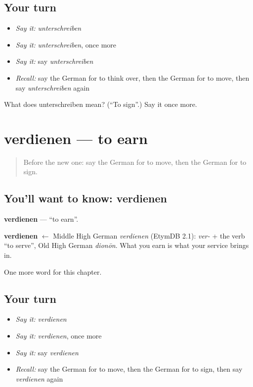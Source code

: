 \subsection*{Your turn}
\begin{itemize}
\raggedright
  \item \emph{Say it:} \emph{unterschreiben}
  \item \emph{Say it:} \emph{unterschreiben}, once more
  \item \emph{Say it:} say \emph{unterschreiben}
  \item \emph{Recall:} say the German for to think over, then the German for to move, then say \emph{unterschreiben} again
\end{itemize}

\begin{tcolorbox}[breakable,colback=teal!4,colframe=teal!35!black,title={Before you move on}]
What does unterschreiben mean? (\textquotedblleft{}To sign\textquotedblright{}.) Say it once more.
\end{tcolorbox}
\section[verdienen]{verdienen — to earn}

\label{lesson:GE-C152-verdienen}



\begin{quote}
Before the new one: say the German for to move, then the German for to sign.
\end{quote}

\subsection*{You'll want to know: verdienen}
\textbf{verdienen} — \textquotedblleft{}to earn\textquotedblright{}.

\begin{cousinweb}
\textbf{verdienen} $\leftarrow$ Middle High German \emph{verdienen} (EtymDB 2.1): \emph{ver-} + the verb \textquotedblleft{}to serve\textquotedblright{}, Old High German \emph{dionōn}. What you earn is what your service brings in.
\end{cousinweb}

\begin{grammarlens}[title={What you've built}]
One more word for this chapter.
\end{grammarlens}

\subsection*{Your turn}
\begin{itemize}
\raggedright
  \item \emph{Say it:} \emph{verdienen}
  \item \emph{Say it:} \emph{verdienen}, once more
  \item \emph{Say it:} say \emph{verdienen}
  \item \emph{Recall:} say the German for to move, then the German for to sign, then say \emph{verdienen} again
\end{itemize}

